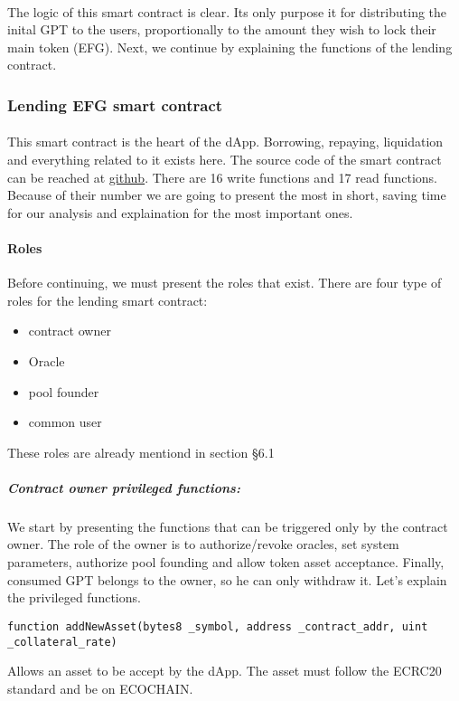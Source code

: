 \documentclass{article}
\begin{document}
\paragraph{ }
The logic of this smart contract is clear. Its only purpose it for distributing the inital GPT to the users, proportionally to the amount they wish to lock their main token (EFG). Next, we continue by explaining the functions of the lending contract.

\subsubsection{Lending EFG smart contract}
\paragraph{ }
This smart contract is the heart of the dApp. Borrowing, repaying, liquidation and everything related to it exists here. The source code of the smart contract can be reached at  \href{https://github.com/Defi-EFG/EFG-smart-contracts/blob/develop/lending/LendingContract.sol}{github}. There are 16 write functions and 17 read functions. Because of their number we are going to present the most in short, saving time for our analysis and explaination for the most important ones.
\paragraph{Roles}
Before continuing, we must present the roles that exist. There are four type of roles for the lending smart contract:
\begin{itemize}
\item contract owner
\item Oracle
\item pool founder
\item common user
\end{itemize}
These roles are already mentiond in section \S6.1
\subparagraph{Contract owner privileged functions:}
We start by presenting the functions that can be triggered only by the contract owner. The role of the owner is to authorize/revoke oracles, set system parameters, authorize pool founding and allow token asset acceptance. Finally, consumed GPT belongs to the owner, so he can only withdraw it. Let's explain the privileged functions. 

\begin{lstlisting}[language=Solidity,numbers=none,escapechar=@]
function addNewAsset(bytes8 _symbol, address _contract_addr, uint _collateral_rate)
\end{lstlisting}
Allows an asset to be accept by the dApp. The asset must follow the ECRC20 standard and be on ECOCHAIN.
\end{document}
